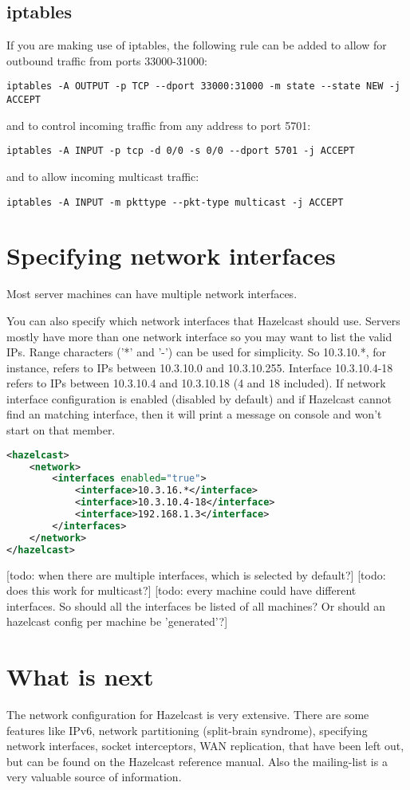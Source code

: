 \subsection{iptables}
If you are making use of iptables, the following rule can be added to allow for outbound traffic from ports 33000-31000:
\begin{lstlisting}
iptables -A OUTPUT -p TCP --dport 33000:31000 -m state --state NEW -j ACCEPT
\end{lstlisting}
and to control incoming traffic from any address to port 5701:
\begin{lstlisting}
iptables -A INPUT -p tcp -d 0/0 -s 0/0 --dport 5701 -j ACCEPT
\end{lstlisting}
and to allow incoming multicast traffic:
\begin{lstlisting}
iptables -A INPUT -m pkttype --pkt-type multicast -j ACCEPT
\end{lstlisting}

\section{Specifying network interfaces}
Most server machines can have multiple network interfaces. 

You can also specify which network interfaces that Hazelcast should use. Servers mostly have more than one network interface so you may want to list the valid IPs. Range characters ('*' and '-') can be used for simplicity. So 10.3.10.*, for instance, refers to IPs between 10.3.10.0 and 10.3.10.255. Interface 10.3.10.4-18 refers to IPs between 10.3.10.4 and 10.3.10.18 (4 and 18 included). If network interface configuration is enabled (disabled by default) and if Hazelcast cannot find an matching interface, then it will print a message on console and won't start on that member.

\begin{lstlisting}[language=xml]
<hazelcast>
    <network>
        <interfaces enabled="true">
            <interface>10.3.16.*</interface> 
            <interface>10.3.10.4-18</interface> 
            <interface>192.168.1.3</interface>         
        </interfaces>    
    </network>
</hazelcast>
\end{lstlisting}

[todo: when there are multiple interfaces, which is selected by default?]
[todo: does this work for multicast?]
[todo: every machine could have different interfaces. So should all the interfaces be listed of all machines? Or should an hazelcast config per machine be 'generated'?]

\section{What is next}
The network configuration for Hazelcast is very extensive. There are some features like IPv6,  network partitioning (split-brain syndrome), specifying network interfaces, socket interceptors, WAN replication, that have been left out, but can be found on the Hazelcast reference manual. Also the mailing-list is a very valuable source of information.

